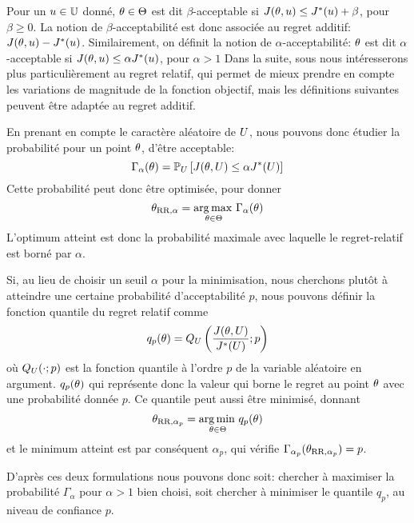 \documentclass[../../Main_ManuscritThese.tex]{subfiles}
\begin{document}
Pour un $u\in\mathbb{U}$ donné, $\theta\in\Theta$ est dit
$\beta$-acceptable si $J(\theta, u) \leq J^*(u) + \beta$, pour
$\beta \geq 0$. La notion de $\beta$-acceptabilité est donc associée
au regret additif: $J(\theta, u) - J^*(u)$.  Similairement, on
définit la notion de $\alpha$-acceptabilité: $\theta$ est dit
$\alpha$-acceptable si $J(\theta, u) \leq \alpha J^*(u)$, pour
$\alpha > 1$ Dans la suite, sous nous intéresserons plus
particulièrement au regret relatif, qui permet de mieux prendre en
compte les variations de magnitude de la fonction objectif, mais les
définitions suivantes peuvent être adaptée au regret additif.


En prenant en compte le caractère aléatoire de $U$, nous pouvons
donc étudier la probabilité pour un point $\theta$, d'être acceptable:
\begin{equation*}
\Gamma_{\alpha}(\theta) = \mathbb{P}_{U}\left[J(\theta,U) \leq \alpha J^*(U) \right]
\end{equation*}
Cette probabilité peut donc être optimisée, pour donner
\begin{equation}
  \theta_{\mathrm{RR},\alpha} = \operatorname*{arg\,max \,}_{\theta \in\Theta} \Gamma_\alpha(\theta)
\end{equation}
L'optimum atteint est donc la probabilité maximale avec laquelle le
regret-relatif est borné par $\alpha$.


Si, au lieu de choisir un seuil $\alpha$ pour la minimisation, nous
cherchons plutôt à atteindre une certaine probabilité d'acceptabilité
$p$, nous pouvons définir la fonction quantile du regret relatif comme
\begin{equation}
  q_p(\theta) = Q_{U}\left(\frac{J(\theta,U)}{J^*(U)};p\right)
\end{equation}
où $Q_{U}(\cdot;p)$ est la fonction quantile à l'ordre $p$ de la
variable aléatoire en argument. $q_p(\theta)$ qui représente donc la valeur qui
borne le regret au point $\theta$ avec une probabilité donnée $p$.
Ce quantile peut aussi être minimisé, donnant
\begin{equation}
  \theta_{\mathrm{RR},\alpha_p} = \operatorname*{arg\,min \,}_{\theta \in \Theta} q_p(\theta)
\end{equation}
et le minimum atteint est par conséquent $\alpha_p$, qui vérifie
$\Gamma_{\alpha_p}(\theta_{\mathrm{RR},\alpha_p}) = p$.
  
D'après ces deux formulations nous pouvons donc soit: chercher à
maximiser la probabilité $\Gamma_{\alpha}$ pour $\alpha > 1$ bien
choisi, soit chercher à minimiser le quantile $q_p$, au niveau de
confiance $p$.
\end{document}
